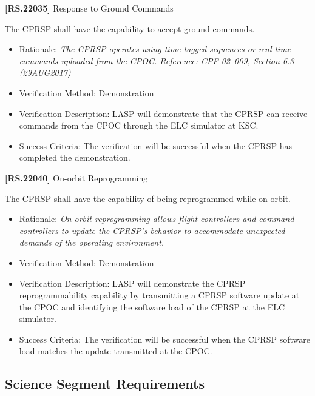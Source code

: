 \documentclass[12pt,oneside,oldfontcommands]{memoir}
\begin{document}
\textbf{[RS.22035]} Response to Ground Commands

The \gls{CPRSP} shall have the capability to accept ground commands.

\begin{itemize}
\item{} Rationale: \emph{The CPRSP operates using time-tagged sequences or real-time commands uploaded from the CPOC. Reference: CPF-02--009, Section 6.3 (29AUG2017)}

\item{} Verification Method: Demonstration

\item{} Verification Description: \gls{LASP} will demonstrate that the \gls{CPRSP} can receive commands from the \gls{CPOC} through the \gls{ELC} simulator at \gls{KSC}.

\item{} Success Criteria: The verification will be successful when the \gls{CPRSP} has completed the \gls{demonstration}.

\end{itemize}

\textbf{[RS.22040]} On-orbit Reprogramming

The \gls{CPRSP} shall have the capability of being reprogrammed while on orbit.

\begin{itemize}
\item{} Rationale: \emph{On-orbit reprogramming allows flight controllers and command controllers to update the CPRSP's behavior to accommodate unexpected demands of the operating environment.}

\item{} Verification Method: Demonstration

\item{} Verification Description: \gls{LASP} will demonstrate the \gls{CPRSP} reprogrammability capability by transmitting a \gls{CPRSP} software update at the \gls{CPOC} and identifying the software load of the \gls{CPRSP} at the \gls{ELC} simulator.

\item{} Success Criteria: The verification will be successful when the \gls{CPRSP} software load matches the update transmitted at the \gls{CPOC}.

\end{itemize}

\subsection{Science Segment Requirements}
\label{sciencesegmentrequirements}
\end{document}
